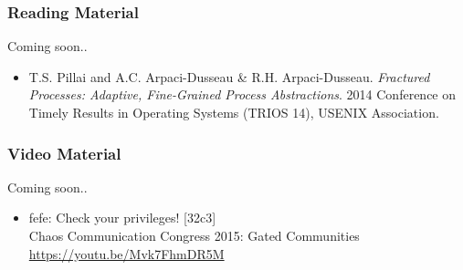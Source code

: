 \begin{frame}

\frametitle{Reading Material}

\begin{center}

Coming soon..

\end{center}

\footnotesize

\begin{itemize}

\item T.S. Pillai and A.C. Arpaci-Dusseau \& R.H. Arpaci-Dusseau.
\emph{Fractured Processes: Adaptive, Fine-Grained Process Abstractions}. 2014
Conference on Timely Results in Operating Systems (TRIOS 14), USENIX
Association.

\end{itemize}

\end{frame}


\begin{frame}

\frametitle{Video Material}

\begin{center}

Coming soon..

\end{center}

\footnotesize

\begin{itemize}

\item fefe: Check your privileges! [32c3] \\
Chaos Communication Congress 2015: Gated Communities \\
\hspace{0.1in} \url{https://youtu.be/Mvk7FhmDR5M}

\end{itemize}

\end{frame}

